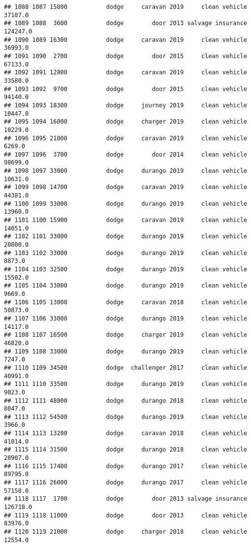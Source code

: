 \documentclass[
]{article}
\begin{document}
\begin{verbatim}
## 1088 1087 15800           dodge     caravan 2019     clean vehicle   37107.0
## 1089 1088  3600           dodge        door 2013 salvage insurance  124247.0
## 1090 1089 16300           dodge     caravan 2019     clean vehicle   36993.0
## 1091 1090  2700           dodge        door 2015     clean vehicle   67133.0
## 1092 1091 12800           dodge     caravan 2019     clean vehicle   33580.0
## 1093 1092  9700           dodge        door 2015     clean vehicle   94140.0
## 1094 1093 18300           dodge     journey 2019     clean vehicle   10447.0
## 1095 1094 16000           dodge     charger 2019     clean vehicle   10229.0
## 1096 1095 21000           dodge     caravan 2019     clean vehicle    6269.0
## 1097 1096  3700           dodge        door 2014     clean vehicle   98699.0
## 1098 1097 33000           dodge     durango 2019     clean vehicle   10631.0
## 1099 1098 14700           dodge     caravan 2019     clean vehicle   44381.0
## 1100 1099 33000           dodge     durango 2019     clean vehicle   13960.0
## 1101 1100 15900           dodge     caravan 2019     clean vehicle   14051.0
## 1102 1101 33000           dodge     durango 2019     clean vehicle   20800.0
## 1103 1102 33000           dodge     durango 2019     clean vehicle    8873.0
## 1104 1103 32500           dodge     durango 2019     clean vehicle   15502.0
## 1105 1104 33000           dodge     durango 2019     clean vehicle    9669.0
## 1106 1105 13000           dodge     caravan 2018     clean vehicle   50873.0
## 1107 1106 33000           dodge     durango 2019     clean vehicle   14117.0
## 1108 1107 16500           dodge     charger 2019     clean vehicle   46820.0
## 1109 1108 33000           dodge     durango 2019     clean vehicle    7247.0
## 1110 1109 34500           dodge  challenger 2017     clean vehicle   40991.0
## 1111 1110 33500           dodge     durango 2019     clean vehicle    9023.0
## 1112 1111 48000           dodge     durango 2018     clean vehicle    8047.0
## 1113 1112 54500           dodge     durango 2019     clean vehicle    3966.0
## 1114 1113 13200           dodge     caravan 2018     clean vehicle   41014.0
## 1115 1114 31500           dodge     durango 2018     clean vehicle   20907.0
## 1116 1115 17400           dodge     durango 2017     clean vehicle   89795.0
## 1117 1116 26000           dodge     durango 2017     clean vehicle   57158.0
## 1118 1117  1700           dodge        door 2013 salvage insurance  126718.0
## 1119 1118 11000           dodge        door 2013     clean vehicle   83976.0
## 1120 1119 21000           dodge     charger 2018     clean vehicle   12554.0

\end{verbatim}
\end{document}
